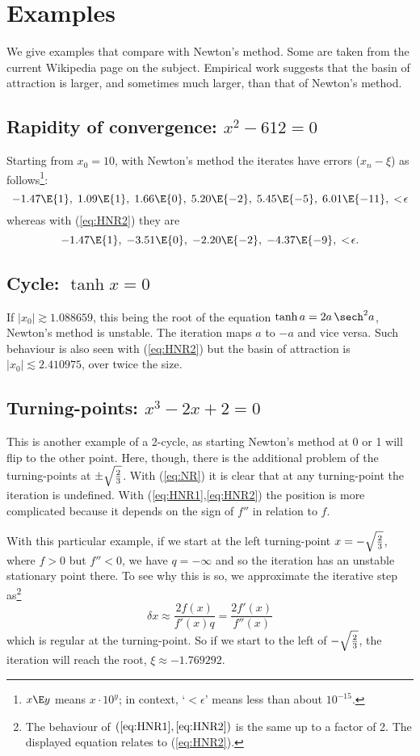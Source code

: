 \section{Examples}

We give examples that compare with Newton's method. Some are taken from the current Wikipedia page on the subject. Empirical work suggests that the basin of attraction is larger, and sometimes much larger, than that of Newton's method.

\subsection*{Rapidity of convergence: $x^2-612=0$}

Starting from $x_0=10$, with Newton's method the iterates have errors ($x_n-\xi$) as follows\footnote{$x\E y$ means $x\cdot 10^y$; in context, `$<\!\epsilon$' means less than about $10^{-15}$. }:
\[
-1.47\E{1},\;
1.09\E{1}, \;
1.66\E{0},\;
5.20\E{-2},\;
5.45\E{-5},\;
6.01\E{-11}, \;
{<\!\epsilon}
\]
whereas with (\ref{eq:HNR2}) they are
\[
-1.47\E{1},\;
-3.51\E{0},\;
-2.20\E{-2},\;
-4.37\E{-9},\;
{<\!\epsilon}.
\]


\subsection*{Cycle: $\tanh x=0$}
If $|x_0| \gtrsim 1.088659$, this being the root of the equation $\tanh a = 2a \,\sech^2 a$, Newton's method is unstable. The iteration maps $a$ to $-a$ and vice versa.
Such behaviour is also seen with (\ref{eq:HNR2}) but the basin of attraction is $|x_0| \lesssim 2.410975$, over twice the size.

\subsection*{Turning-points: $x^3-2x+2=0$}
This is another example of a 2-cycle, as starting Newton's method at 0 or 1 will flip to the other point. Here, though, there is the additional problem of the turning-points at $\pm\sqrt{2\over3}$. 
With (\ref{eq:NR}) it is clear that at any turning-point the iteration is undefined. With (\ref{eq:HNR1},\ref{eq:HNR2}) the position is more complicated because it depends on the sign of $f''$ in relation to $f$.

With this particular example, if we start at the left turning-point $x=-\sqrt{2\over3}$, where $f>0$ but $f''<0$, we have $q=-\infty$ and so the iteration has an unstable stationary point there. To see why this is so, we approximate the iterative step as\footnote{The behaviour of $(\ref{eq:HNR1},\ref{eq:HNR2})$ is the same up to a factor of 2. The displayed equation relates to (\ref{eq:HNR2}).}
\[
\delta x \approx \frac{2f(x)}{f'(x)q} =  \frac{2f'(x)}{f''(x)}
\]
which is regular at the turning-point. So if we start to the left of $-\sqrt{2\over3}$, the iteration will reach the root, $\xi\approx -1.769292$.

